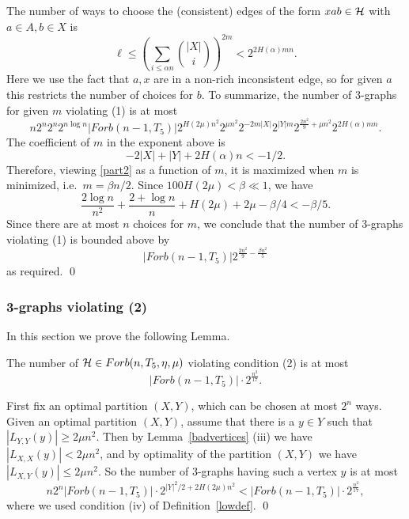 \documentclass[11pt]{article}
\begin{document}
 The number of ways to choose the (consistent) edges of the form
$xab\in \mathcal{H}$ with $a\in A, b\in X$ is
$$\ell\le \left(\sum_{i\le \alpha n}\binom{|X|}{i}\right)^{2m}< 2^{2H(\alpha)mn}.$$ Here we use the fact that $a,x$ are
in a non-rich inconsistent edge, so for given $a$ this restricts the
number of choices for  $b$. To summarize, the number of 3-graphs
for given $m$ violating (1) is at most
\begin{equation}\label{part2} n2^n2^n 2^{n\log n}|Forb(n-1,T_5)|2^{H(2\mu)n^2}2^{\mu n^2}
2^{-2m|X|} 2^{|Y|m}2^{\frac{2n^2}{9}+\mu n^2}2^{2H(\alpha)mn}.
\end{equation}
The coefficient of $m$ in the exponent above is
$$-2|X|+|Y|+2H(\alpha)n<-1/2.$$
Therefore, viewing \eqref{part2} as a function of $m$, it is maximized when $m$
is minimized, i.e.~$m = \beta n/2$. Since $100H(2\mu)<\beta \ll 1$, we have
$$\frac{2\log n}{n^2}+\frac{2+\log n}{n} + H(2\mu)+ 2\mu-\beta/4 <-\beta/5.$$ Since there are at most $n$ choices for $m$, we conclude that the
number of 3-graphs violating (1) is bounded above by
\begin{equation}\label{part2s}
|Forb(n-1,T_5)|2^{\frac{2n^2}{9} - \frac{\beta n^2}{5}}
\end{equation}
as required. \qed



\subsubsection{3-graphs  violating
(2)}  In this section we prove the following Lemma.

\begin{lemma} \label{2}
The number of  $\mathcal{H} \in Forb(n,T_5,\eta,\mu)$ violating condition (2)
is at most
$$|Forb(n-1,T_5)|\cdot 2^{\frac{n^2}{17}}.$$
\end{lemma}
\proof
 First
fix an optimal partition $(X,Y)$, which can be chosen at most $2^n$
ways. Given an optimal partition $(X,Y)$, assume that there is a
$y\in Y$ such that $|L_{Y,Y}(y)|\ge 2\mu n^2.$ Then by
Lemma~\ref{badvertices} (iii) we have $|L_{X,X}(y)|< 2\mu n^2$, and
by optimality of the partition $(X,Y)$ we have $|L_{X,Y}(y)|\le 2\mu
n^2$. So the number of 3-graphs having such a vertex $y$ is at
most
\begin{equation}\label{onebad}
n2^n |Forb(n-1,T_5)|\cdot 2^{{|Y|^2}/{2}+2H(2\mu)n^2}<
|Forb(n-1,T_5)|\cdot 2^{\frac{n^2}{17}},
\end{equation}
where we used  condition (iv) of Definition~\ref{lowdef}. \qed
\end{document}

